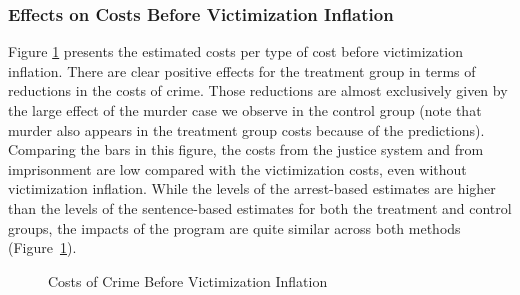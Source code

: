 \subsubsection{Effects on Costs Before Victimization Inflation}  Figure \ref{tab:diff-costs} presents the estimated costs per type of cost before victimization inflation.
\noindent There are clear positive effects for the treatment group in terms of reductions in the costs of crime. Those reductions are almost exclusively given by the large effect of the murder case we observe in the control group (note that murder also appears in the treatment group costs because of the predictions). Comparing the bars in this figure, the costs from the justice system and from imprisonment are low compared with the victimization costs, even without victimization inflation. While the levels of the arrest-based estimates are higher than the levels of the sentence-based estimates for both the treatment and control groups, the impacts of the program are quite similar across both methods (Figure~\ref{tab:diff-costs}). \\

\begin{figure} [H]
\caption{Costs of Crime Before Victimization Inflation}
\centering  \label{tab:diff-costs}
{}
\end{figure}

